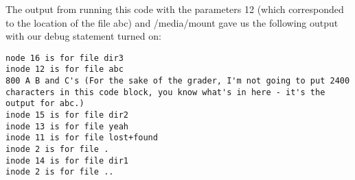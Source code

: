 \documentclass[12pt, a4paper, oneside]{article}
\begin{document}
The output from running this code with the parameters 12 (which corresponded to the location of the file abc) and /media/mount gave us the following output with our debug statement turned on:
\begin{lstlisting}
node 16 is for file dir3
inode 12 is for file abc
800 A B and C's (For the sake of the grader, I'm not going to put 2400 characters in this code block, you know what's in here - it's the output for abc.)
inode 15 is for file dir2
inode 13 is for file yeah
inode 11 is for file lost+found
inode 2 is for file .
inode 14 is for file dir1
inode 2 is for file ..
\end{lstlisting}
\end{document}
